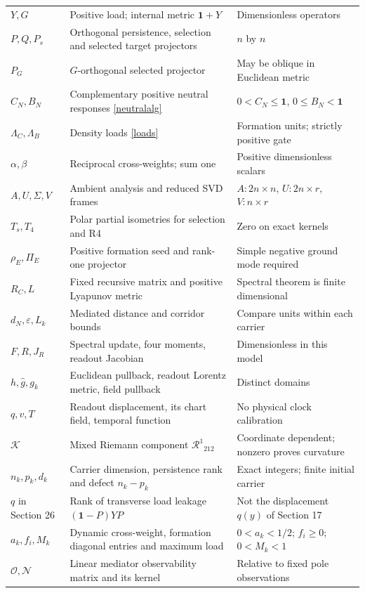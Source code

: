 \documentclass[11pt,letterpaper]{article}
\newcommand{\Id}{\mathbf 1}
\theoremstyle{definition}
\numberwithin{equation}{section}
\begin{document}
\begin{longtable}{p{}p{}p{}}
$Y,G$ & Positive load; internal metric $\Id+Y$ & Dimensionless operators\\
$P,Q,P_s$ & Orthogonal persistence, selection and selected target projectors & $n$ by $n$\\
$P_G$ & $G$-orthogonal selected projector & May be oblique in Euclidean metric\\
$C_N,B_N$ & Complementary positive neutral responses \eqref{neutralalg} & $0<C_N\leq\Id$, $0\leq B_N<\Id$\\
$\Lambda_C,\Lambda_B$ & Density loads \eqref{loads} & Formation units; strictly positive gate\\
$\alpha,\beta$ & Reciprocal cross-weights; sum one & Positive dimensionless scalars\\
$A,U,\Sigma,V$ & Ambient analysis and reduced SVD frames & $A:2n\times n$, $U:2n\times r$, $V:n\times r$\\
$T_s,T_4$ & Polar partial isometries for selection and R4 & Zero on exact kernels\\
$\rho_E,\Pi_E$ & Positive formation seed and rank-one projector & Simple negative ground mode required\\
$R_C,L$ & Fixed recursive matrix and positive Lyapunov metric & Spectral theorem is finite dimensional\\
$d_N,\varepsilon,L_k$ & Mediated distance and corridor bounds & Compare units within each carrier\\
$F,R,J_R$ & Spectral update, four moments, readout Jacobian & Dimensionless in this model\\
$h,\widehat g,g_k$ & Euclidean pullback, readout Lorentz metric, field pullback & Distinct domains\\
$q,v,T$ & Readout displacement, its chart field, temporal function & No physical clock calibration\\
$\mathcal K$ & Mixed Riemann component $\mathcal R^1{}_{212}$ & Coordinate dependent; nonzero proves curvature\\
$n_k,p_k,d_k$ & Carrier dimension, persistence rank and defect $n_k-p_k$ & Exact integers; finite initial carrier\\
$q$ in Section 26 & Rank of transverse load leakage $(\Id-P)YP$ & Not the displacement $q(y)$ of Section 17\\
$a_k,f_i,M_k$ & Dynamic cross-weight, formation diagonal entries and maximum load & $0<a_k<1/2$; $f_i\geq0$; $0<M_k<1$\\
$\mathcal O,\mathcal N$ & Linear mediator observability matrix and its kernel & Relative to fixed pole observations\\

\end{longtable}
\end{document}
